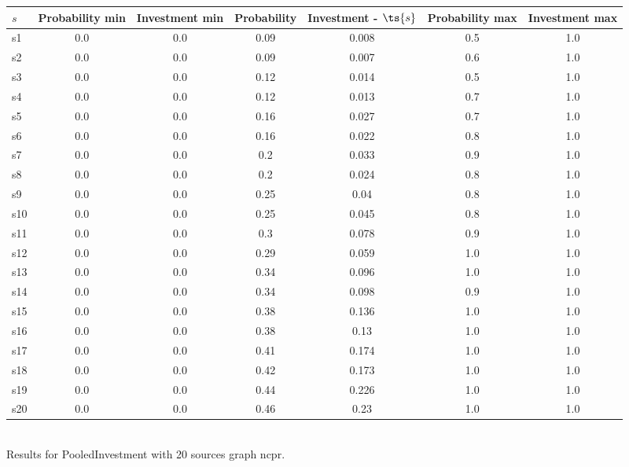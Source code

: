 \documentclass{article}
\begin{document}
\noindent\begin{tabular}{|l|c|c|c|c|c|c|}
\hline
$s$& Probability min & Investment min & Probability & Investment - $\ts{s}$ & Probability max & Investment max\\
\hline
s1 &0.0 & 0.0 & 0.09 & 0.008 & 0.5 & 1.0\\
\hline
s2 &0.0 & 0.0 & 0.09 & 0.007 & 0.6 & 1.0\\
\hline
s3 &0.0 & 0.0 & 0.12 & 0.014 & 0.5 & 1.0\\
\hline
s4 &0.0 & 0.0 & 0.12 & 0.013 & 0.7 & 1.0\\
\hline
s5 &0.0 & 0.0 & 0.16 & 0.027 & 0.7 & 1.0\\
\hline
s6 &0.0 & 0.0 & 0.16 & 0.022 & 0.8 & 1.0\\
\hline
s7 &0.0 & 0.0 & 0.2 & 0.033 & 0.9 & 1.0\\
\hline
s8 &0.0 & 0.0 & 0.2 & 0.024 & 0.8 & 1.0\\
\hline
s9 &0.0 & 0.0 & 0.25 & 0.04 & 0.8 & 1.0\\
\hline
s10 &0.0 & 0.0 & 0.25 & 0.045 & 0.8 & 1.0\\
\hline
s11 &0.0 & 0.0 & 0.3 & 0.078 & 0.9 & 1.0\\
\hline
s12 &0.0 & 0.0 & 0.29 & 0.059 & 1.0 & 1.0\\
\hline
s13 &0.0 & 0.0 & 0.34 & 0.096 & 1.0 & 1.0\\
\hline
s14 &0.0 & 0.0 & 0.34 & 0.098 & 0.9 & 1.0\\
\hline
s15 &0.0 & 0.0 & 0.38 & 0.136 & 1.0 & 1.0\\
\hline
s16 &0.0 & 0.0 & 0.38 & 0.13 & 1.0 & 1.0\\
\hline
s17 &0.0 & 0.0 & 0.41 & 0.174 & 1.0 & 1.0\\
\hline
s18 &0.0 & 0.0 & 0.42 & 0.173 & 1.0 & 1.0\\
\hline
s19 &0.0 & 0.0 & 0.44 & 0.226 & 1.0 & 1.0\\
\hline
s20 &0.0 & 0.0 & 0.46 & 0.23 & 1.0 & 1.0\\
\hline
\end{tabular}\\

\noindent Results for PooledInvestment with 20 sources graph ncpr.
\end{document}
